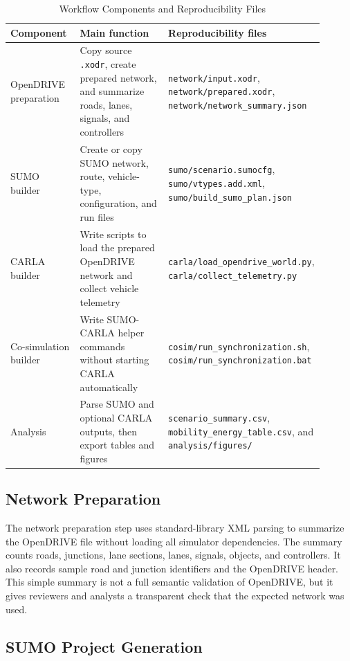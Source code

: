 \documentclass[10pt,numbered]{\selectedmanuscriptclass}
\begin{document}
\begin{table}[htbp]
  \caption{Workflow Components and Reproducibility Files}
  \label{tab:workflow}
  \centering
  \begin{tabular}{p{0.23\linewidth}p{0.33\linewidth}p{0.34\linewidth}}
    \hline
    Component & Main function & Reproducibility files \\
    \hline
    OpenDRIVE preparation & Copy source \texttt{.xodr}, create prepared
    network, and summarize roads, lanes, signals, and controllers &
    \texttt{network/input.xodr}, \texttt{network/prepared.xodr},
    \texttt{network/network\_summary.json} \\
    SUMO builder & Create or copy SUMO network, route, vehicle-type,
    configuration, and run files & \texttt{sumo/scenario.sumocfg},
    \texttt{sumo/vtypes.add.xml}, \texttt{sumo/build\_sumo\_plan.json} \\
    CARLA builder & Write scripts to load the prepared OpenDRIVE network and
    collect vehicle telemetry & \texttt{carla/load\_opendrive\_world.py},
    \texttt{carla/collect\_telemetry.py} \\
    Co-simulation builder & Write SUMO-CARLA helper commands without starting
    CARLA automatically & \texttt{cosim/run\_synchronization.sh},
    \texttt{cosim/run\_synchronization.bat} \\
    Analysis & Parse SUMO and optional CARLA outputs, then export tables and
    figures & \texttt{scenario\_summary.csv},
    \texttt{mobility\_energy\_table.csv}, and
    \texttt{analysis/figures/} \\
    \hline
  \end{tabular}
\end{table}

\subsection{Network Preparation}

The network preparation step uses standard-library XML parsing to summarize the
OpenDRIVE file without loading all simulator dependencies. The summary counts
roads, junctions, lane sections, lanes, signals, objects, and controllers. It
also records sample road and junction identifiers and the OpenDRIVE header. This
simple summary is not a full semantic validation of OpenDRIVE, but it gives
reviewers and analysts a transparent check that the expected network was used.

\subsection{SUMO Project Generation}
\end{document}
